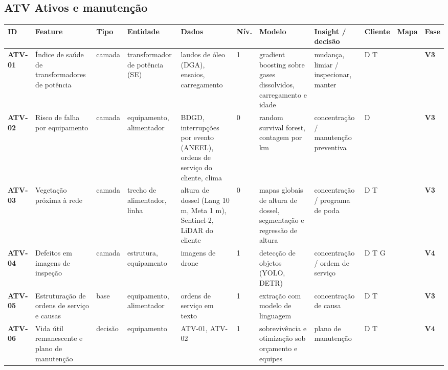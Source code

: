 \subsection*{ATV \textperiodcentered{} Ativos e manutenção}
\label{cat:ATV}
{\footnotesize\setlength{\tabcolsep}{3pt}
\begin{longtable}{@{}P{1.35cm}P{4.1cm}P{1.3cm}P{3.1cm}P{3.7cm}C{0.6cm}P{3.6cm}P{3.3cm}P{1.1cm}P{0.9cm}P{1.1cm}@{}}
\toprule
\textbf{ID} & \textbf{Feature} & \textbf{Tipo} & \textbf{Entidade} & \textbf{Dados} & \textbf{Nív.} & \textbf{Modelo} & \textbf{Insight / decisão} & \textbf{Cliente} & \textbf{Mapa} & \textbf{Fase} \\
\midrule\endhead
\textbf{ATV-01} & Índice de saúde de transformadores de potência & camada & transformador de potência (SE) & laudos de óleo (DGA), ensaios, carregamento & 1 & gradient boosting sobre gases dissolvidos, carregamento e idade & mudança, limiar / inspecionar, manter & D T &  & \colorbox{fV3}{\scriptsize \textbf{V3}} \\
\textbf{ATV-02} & Risco de falha por equipamento & camada & equipamento, alimentador & BDGD, interrupções por evento (ANEEL), ordens de serviço do cliente, clima & 0 & random survival forest, contagem por km & concentração / manutenção preventiva & D &  & \colorbox{fV3}{\scriptsize \textbf{V3}} \\
\textbf{ATV-03} & Vegetação próxima à rede & camada & trecho de alimentador, linha & altura de dossel (Lang 10 m, Meta 1 m), Sentinel-2, LiDAR do cliente & 0 & mapas globais de altura de dossel, segmentação e regressão de altura & concentração / programa de poda & D T &  & \colorbox{fV3}{\scriptsize \textbf{V3}} \\
\textbf{ATV-04} & Defeitos em imagens de inspeção & camada & estrutura, equipamento & imagens de drone & 1 & detecção de objetos (YOLO, DETR) & concentração / ordem de serviço & D T G &  & \colorbox{fV4}{\scriptsize \textbf{V4}} \\
\textbf{ATV-05} & Estruturação de ordens de serviço e causas & base & equipamento, alimentador & ordens de serviço em texto & 1 & extração com modelo de linguagem & concentração de causa & D T &  & \colorbox{fV3}{\scriptsize \textbf{V3}} \\
\textbf{ATV-06} & Vida útil remanescente e plano de manutenção & decisão & equipamento & ATV-01, ATV-02 & 1 & sobrevivência e otimização sob orçamento e equipes & plano de manutenção & D T &  & \colorbox{fV4}{\scriptsize \textbf{V4}} \\
\bottomrule
\end{longtable}}

